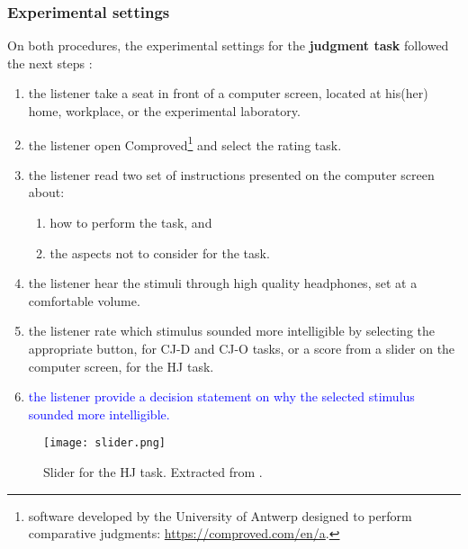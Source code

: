 \subsubsection{Experimental settings} \label{ss_sect:expset}
%
On both procedures, the experimental settings for the \textbf{judgment task} followed the next steps \citep{Boonen_et_al_2020, Boonen_et_al_2021}:
%
\begin{enumerate} \itemsep1pt
	\item the listener take a seat in front of a computer screen, located at his(her) home, workplace, or the experimental laboratory.
	\item the listener open Comproved\footnote{software developed by the University of Antwerp designed to perform comparative judgments: \url{https://comproved.com/en/a}.} and select the rating task.
	\item the listener read two set of instructions presented on the computer screen about:
	\begin{enumerate}
		\item how to perform the task, and
		\item the aspects not to consider for the task.
	\end{enumerate}
	\item the listener hear the stimuli through high quality headphones, set at a comfortable volume.
	\item the listener rate which stimulus sounded more intelligible by selecting the appropriate button, for CJ-D and CJ-O tasks, or a score from a slider on the computer screen, for the HJ task.
	\item \textcolor{blue}{the listener provide a decision statement on why the selected stimulus sounded more intelligible.}
\end{enumerate}
%
\begin{figure}[h]
	\centering
	\texttt{[image: slider.png]}
	\caption[Slider for the HJ task.]%
	{Slider for the HJ task. Extracted from \citet{Boonen_et_al_2021}.}
	\label{fig:slider}
\end{figure}
%
